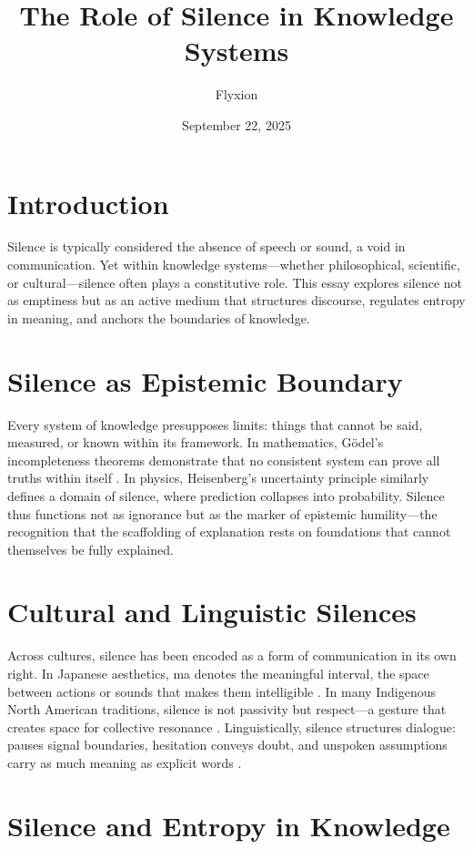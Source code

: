 \documentclass{article}
\title{The Role of Silence in Knowledge Systems}
\author{Flyxion}
\date{September 22, 2025}
\begin{document}
\maketitle

\section{Introduction}

Silence is typically considered the absence of speech or sound, a void in communication. Yet within knowledge systems—whether philosophical, scientific, or cultural—silence often plays a constitutive role. This essay explores silence not as emptiness but as an active medium that structures discourse, regulates entropy in meaning, and anchors the boundaries of knowledge.

\section{Silence as Epistemic Boundary}

Every system of knowledge presupposes limits: things that cannot be said, measured, or known within its framework. In mathematics, Gödel’s incompleteness theorems demonstrate that no consistent system can prove all truths within itself \citep{Godel1931}. In physics, Heisenberg’s uncertainty principle \citep{Heisenberg1927} similarly defines a domain of silence, where prediction collapses into probability. Silence thus functions not as ignorance but as the marker of epistemic humility—the recognition that the scaffolding of explanation rests on foundations that cannot themselves be fully explained.

\section{Cultural and Linguistic Silences}

Across cultures, silence has been encoded as a form of communication in its own right. In Japanese aesthetics, ma denotes the meaningful interval, the space between actions or sounds that makes them intelligible \citep{Isozaki2006}. In many Indigenous North American traditions, silence is not passivity but respect—a gesture that creates space for collective resonance \citep{Basso1970}. Linguistically, silence structures dialogue: pauses signal boundaries, hesitation conveys doubt, and unspoken assumptions carry as much meaning as explicit words \citep{Jaworski1993}.

\section{Silence and Entropy in Knowledge}
\end{document}
